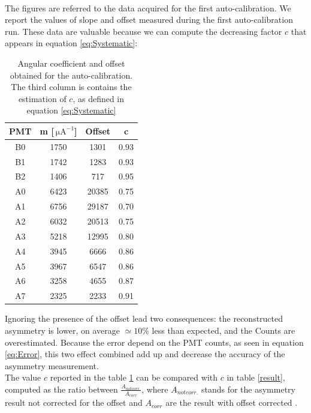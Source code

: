 \begin{figure}[ht]
\centering
{} \\
\end{figure}

The figures are referred to the data acquired for the first auto-calibration. We report the values of slope and offset measured during the first auto-calibration run. These data are valuable because we can compute the decreasing factor $c$ that appears in equation \ref{eq:Systematic}:

\begin{table}[ht]
\centering
\begin{tabular}{c|c|c|c}
\hline
 PMT & m [$\SI{}{\micro \ampere}^{-1}$] & Offset & c  \\
\hline
 B0  & 1750 &  1301 &  0.93 \\
 B1  & 1742 &  1283 &  0.93 \\
 B2  & 1406 &   717 &  0.95 \\
 A0  & 6423 & 20385 &  0.75 \\
 A1  & 6756 & 29187 &  0.70 \\
 A2  & 6032 & 20513 &  0.75 \\
 A3  & 5218 & 12995 &  0.80 \\
 A4  & 3945 &  6666 &  0.86 \\
 A5  & 3967 &  6547 &  0.86 \\
 A6  & 3258 &  4655 &  0.87 \\
 A7  & 2325 &  2233 &  0.91 \\
\hline
\end{tabular}
\caption{Angular coefficient and offset obtained for the auto-calibration. The third column is contains the estimation of $c$, as defined in equation \ref{eq:Systematic}}
\label{table:PMToffset}
\end{table}
Ignoring the presence of the offset lead two consequences: the reconstructed asymmetry is lower, on average $ \simeq 10\%$ less than expected, and the Counts are overestimated. Because the error depend on the PMT counts, as seen in equation \ref{eq:Error}, this two effect combined add up and decrease the accuracy of the asymmetry measurement.\\
The value $c$ reported in the table \ref{table:PMToffset} can be compared with $c$ in table \ref{result}, computed as the ratio between $\frac{A_{not corr.}}{A_{corr}}$, where $A_{not corr.}$ stands for the asymmetry result not corrected for the offset and $A_{corr}$ are the result with offset corrected . 

